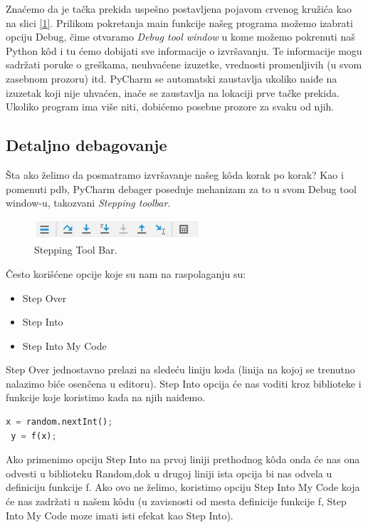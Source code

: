 \documentclass[a4paper]{article}
\begin{document}
Znaćemo da je tačka prekida uspešno postavljena pojavom crvenog kružića\cite{pyCharm} kao na slici \ref{1}. Prilikom pokretanja main funkcije našeg programa možemo izabrati opciju Debug, čime otvaramo \emph{Debug tool window} u kome možemo pokrenuti naš Python k\^{o}d i tu ćemo dobijati sve informacije o izvršavanju. Te informacije mogu sadržati poruke o greškama, neuhvaćene izuzetke, vrednosti promenljivih (u svom zasebnom prozoru) itd\cite{pyCharm}. PyCharm se automatski zaustavlja ukoliko naiđe na izuzetak koji nije uhvaćen, inače se zaustavlja na lokaciji prve tačke prekida\cite{pyCharm}. Ukoliko program ima više niti, dobićemo posebne prozore za svaku od njih\cite{pyCharm}.
\subsection{Detaljno debagovanje}
Šta ako želimo da posmatramo izvršavanje našeg k\^{o}da korak po korak? Kao i pomenuti pdb, PyCharm debager poseduje mehanizam za to u svom Debug tool window-u, takozvani \emph{Stepping toolbar}.
\begin{figure}[h!]
\begin{center}
\includegraphics[scale = 0.6]{2}
\end{center}
\caption{Stepping Tool Bar.}
\label{2}
\end{figure}

Često korišćene opcije koje su nam na raspolaganju su:
\begin{itemize}
\item  Step Over
\item  Step Into
\item Step Into My Code
\end{itemize}

Step Over jednostavno prelazi na sledeću liniju koda (linija na kojoj se trenutno nalazimo biće osenčena u editoru). Step Into opcija će nas voditi kroz biblioteke i funkcije koje koristimo kada na njih naiđemo\cite{pyCharm}.
\begin{lstlisting}[language = Python, caption={Primer korišćenja bilioteke i poziva funkcije}]
 x = random.nextInt();
 y = f(x);
\end{lstlisting} 

Ako primenimo opciju Step Into na prvoj  liniji prethodnog k\^{o}da onda će nas ona odvesti u biblioteku Random,dok u drugoj liniji ista opcija bi nas odvela u definiciju funkcije f. Ako ovo ne želimo, koristimo opciju Step Into My Code koja će nas zadržati u našem k\^{o}du (u zavisnosti od mesta definicije funkcije f, Step Into My Code moze imati isti efekat kao Step Into)\cite{pyCharm}.
\end{document}
